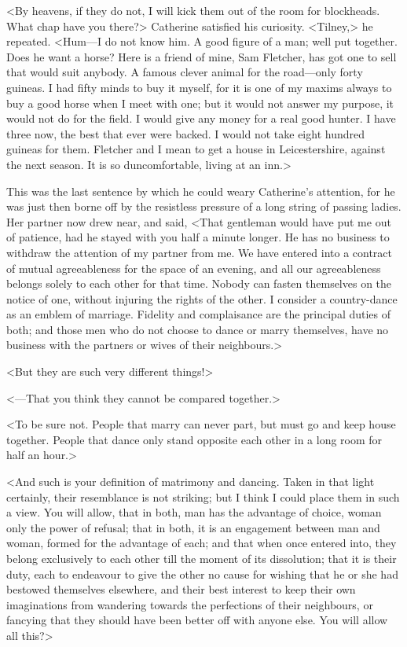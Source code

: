  <By heavens, if they do not, I will kick them out of the room for blockheads. What chap have you there?> Catherine satisfied his curiosity. <Tilney,> he repeated. <Hum—I do not know him. A good figure of a man; well put together. Does he want a horse? Here is a friend of mine, Sam Fletcher, has got one to sell that would suit anybody. A famous clever animal for the road—only forty guineas. I had fifty minds to buy it myself, for it is one of my maxims always to buy a good horse when I meet with one; but it would not answer my purpose, it would not do for the field. I would give any money for a real good hunter. I have three now, the best that ever were backed. I would not take eight hundred guineas for them. Fletcher and I mean to get a house in Leicestershire, against the next season. It is so d\doubleemdash uncomfortable, living at an inn.> 

 This was the last sentence by which he could weary Catherine's attention, for he was just then borne off by the resistless pressure of a long string of passing ladies. Her partner now drew near, and said, <That gentleman would have put me out of patience, had he stayed with you half a minute longer. He has no business to withdraw the attention of my partner from me. We have entered into a contract of mutual agreeableness for the space of an evening, and all our agreeableness belongs solely to each other for that time. Nobody can fasten themselves on the notice of one, without injuring the rights of the other. I consider a country-dance as an emblem of marriage. Fidelity and complaisance are the principal duties of both; and those men who do not choose to dance or marry themselves, have no business with the partners or wives of their neighbours.> 

 <But they are such very different things!> 

 <—That you think they cannot be compared together.> 

 <To be sure not. People that marry can never part, but must go and keep house together. People that dance only stand opposite each other in a long room for half an hour.> 

 <And such is your definition of matrimony and dancing. Taken in that light certainly, their resemblance is not striking; but I think I could place them in such a view. You will allow, that in both, man has the advantage of choice, woman only the power of refusal; that in both, it is an engagement between man and woman, formed for the advantage of each; and that when once entered into, they belong exclusively to each other till the moment of its dissolution; that it is their duty, each to endeavour to give the other no cause for wishing that he or she had bestowed themselves elsewhere, and their best interest to keep their own imaginations from wandering towards the perfections of their neighbours, or fancying that they should have been better off with anyone else. You will allow all this?> 

